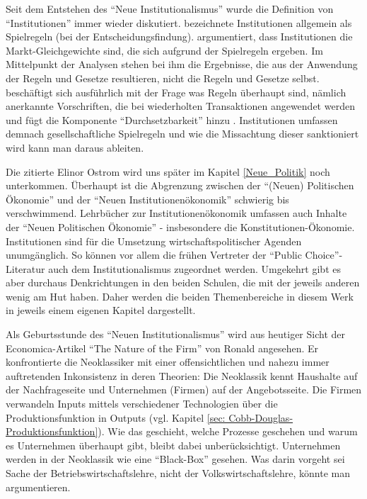 Seit dem Entstehen des "`Neue Institutionalismus"' wurde die Definition von "`Institutionen"' immer wieder diskutiert. \textcite[S. 4]{Riker1980} bezeichnete Institutionen allgemein als Spielregeln (bei der Entscheidungsfindung). \textcite{Schotter1981} argumentiert, dass Institutionen die Markt-Gleichgewichte sind, die sich aufgrund der Spielregeln ergeben. Im Mittelpunkt der Analysen stehen bei ihm die Ergebnisse, die aus der Anwendung der Regeln und Gesetze resultieren, nicht die Regeln und Gesetze selbst. \textcite{Ostrom1986} beschäftigt sich ausführlich mit der Frage was Regeln überhaupt sind, nämlich anerkannte Vorschriften, die bei wiederholten Transaktionen angewendet werden \parencite[S. 5]{Ostrom1986} und fügt die Komponente "`Durchsetzbarkeit"' hinzu \parencite[S. 6]{Ostrom1986}. Institutionen umfassen demnach gesellschaftliche Spielregeln und wie die Missachtung dieser sanktioniert wird \parencite[S. 26]{Voigt2009} kann man daraus ableiten.

Die zitierte Elinor Ostrom wird uns später im Kapitel \ref{Neue_Politik} noch unterkommen. Überhaupt ist die Abgrenzung zwischen der "`(Neuen) Politischen Ökonomie"' und der "`Neuen Institutionenökonomik"' schwierig bis verschwimmend. Lehrbücher zur Institutionenökonomik \parencite{Erlei2016, Voigt2009} umfassen auch Inhalte der "`Neuen Politischen Ökonomie"' - insbesondere die Konstitutionen-Ökonomie. Institutionen sind für die Umsetzung wirtschaftspolitischer Agenden unumgänglich. So können vor allem die frühen Vertreter der "`Public Choice"'-Literatur auch dem Institutionalismus zugeordnet werden. Umgekehrt gibt es aber durchaus Denkrichtungen in den beiden Schulen, die mit der jeweils anderen wenig am Hut haben. Daher werden die beiden Themenbereiche in diesem Werk in jeweils einem eigenen Kapitel dargestellt.

Als Geburtsstunde des "`Neuen Institutionalismus"' wird aus heutiger Sicht der Economica-Artikel "`The Nature of the Firm"' von Ronald \textcite{Coase1937} angesehen. Er konfrontierte die Neoklassiker mit einer offensichtlichen und nahezu immer auftretenden Inkonsistenz in deren Theorien: Die Neoklassik kennt Haushalte auf der Nachfrageseite und Unternehmen (Firmen) auf der Angebotsseite. Die Firmen verwandeln Inputs mittels verschiedener Technologien über die Produktionsfunktion in Outputs (vgl. Kapitel \ref{sec: Cobb-Douglas-Produktionsfunktion}). Wie das geschieht, welche Prozesse geschehen und warum es Unternehmen überhaupt gibt, bleibt dabei unberücksichtigt. Unternehmen werden in der Neoklassik wie eine "`Black-Box"' gesehen. Was darin vorgeht sei Sache der Betriebswirtschaftslehre, nicht der Volkswirtschaftslehre, könnte man argumentieren.


